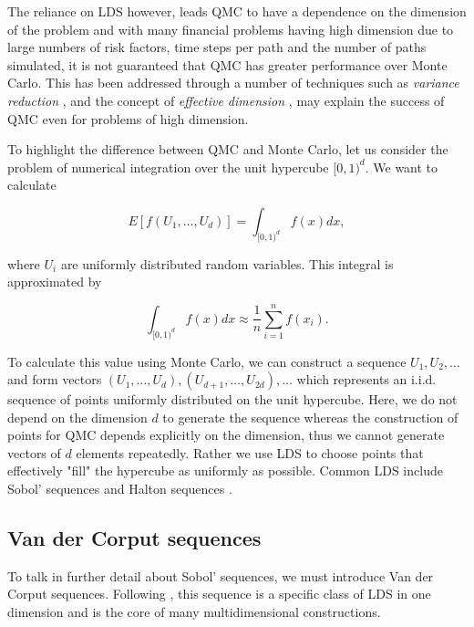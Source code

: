 The reliance on LDS however, leads QMC to have a dependence on the dimension of the problem and with many financial problems having high dimension due to large numbers of risk factors, time steps per path and the number of paths simulated, it is not guaranteed that QMC has greater performance over Monte Carlo. This has been addressed through a number of techniques such as \textit{variance reduction} \cite{allen2011variance}, \cite{WANGvariancereduction} and the concept of \textit{effective dimension} \cite{caflisch_1998}, \cite{WANGeffectivedim} may explain the success of QMC even for problems of high dimension.

To highlight the difference between QMC and Monte Carlo, let us consider the problem of numerical integration over the unit hypercube $[0, 1)^d$. We want to calculate

\begin{equation} \label{eqn:UnitHypercubeIntegral}
    E[f(U_1, \dots, U_d)] = \int_{[0,1)^d} f(x) dx,
\end{equation}

where $U_i$ are uniformly distributed random variables. This integral is approximated by

\begin{equation} \label{eqn:ApproxUnitHypercubeIntegral}
    \int_{[0,1)^d} f(x) dx \approx \frac{1}{n} \sum_{i = 1}^n{f(x_i)}.
\end{equation}

To calculate this value using Monte Carlo, we can construct a sequence $U_1, U_2, \dots$ and form vectors $(U_1, \dots, U_d), (U_{d+1}, \dots, U_{2d}), \dots$ which represents an i.i.d. sequence of points uniformly distributed on the unit hypercube. Here, we do not depend on the dimension $d$ to generate the sequence whereas the construction of points for QMC depends explicitly on the dimension, thus we cannot generate vectors of $d$ elements repeatedly. Rather we use LDS to choose points that effectively "fill" the hypercube as uniformly as possible. Common LDS include Sobol' sequences \cite{sobol1967distribution} and Halton sequences \cite{haltonsequences}.

\subsection{Van der Corput sequences} \label{sec:VanDerCorputSequences}
To talk in further detail about Sobol' sequences, we must introduce Van der Corput sequences. Following \cite{glasserman2004monte}, this sequence is a specific class of LDS in one dimension and is the core of many multidimensional constructions.

